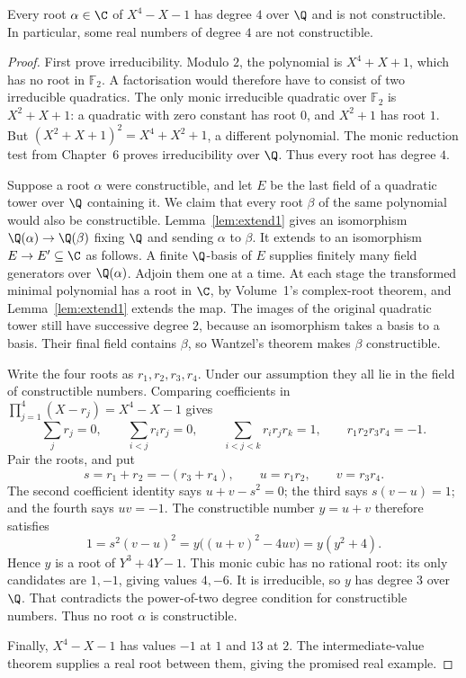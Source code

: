 \begin{proposition}\label{prop:quartic-nonconstructible}
Every root $\alpha\in\C$ of $X^4-X-1$ has degree $4$ over $\Q$ and
is not constructible. In particular, some real numbers of degree $4$
are not constructible.
\end{proposition}
\begin{proof}
First prove irreducibility. Modulo $2$, the polynomial is $X^4+X+1$,
which has no root in $\mathbb F_2$. A factorisation would therefore
have to consist of two irreducible quadratics. The only monic
irreducible quadratic over $\mathbb F_2$ is $X^2+X+1$: a quadratic
with zero constant has root $0$, and $X^2+1$ has root $1$.
But $(X^2+X+1)^2=X^4+X^2+1$, a different polynomial.
The monic reduction test from Chapter~6 proves irreducibility over
$\Q$. Thus every root has degree $4$.

Suppose a root $\alpha$ were constructible, and let $E$ be the last
field of a quadratic tower over $\Q$ containing it. We claim that
every root $\beta$ of the same polynomial would also be constructible.
Lemma~\ref{lem:extend1} gives an isomorphism
$\Q(\alpha)\to\Q(\beta)$ fixing $\Q$ and sending $\alpha$ to $\beta$.
It extends to an isomorphism $E\to E'\subseteq\C$ as follows.
A finite $\Q$-basis of $E$ supplies finitely many field generators
over $\Q(\alpha)$. Adjoin them one at a time. At each stage the
transformed minimal polynomial has a root in $\C$, by Volume~1's
complex-root theorem, and Lemma~\ref{lem:extend1} extends the map.
The images of the original quadratic tower still have successive
degree $2$, because an isomorphism takes a basis to a basis.
Their final field contains $\beta$, so Wantzel's theorem makes
$\beta$ constructible.

Write the four roots as $r_1,r_2,r_3,r_4$. Under our assumption they
all lie in the field of constructible numbers. Comparing coefficients
in $\prod_{j=1}^4(X-r_j)=X^4-X-1$ gives
\[
\sum_jr_j=0,\qquad \sum_{i<j}r_ir_j=0,\qquad
\sum_{i<j<k}r_ir_jr_k=1,\qquad r_1r_2r_3r_4=-1.
\]
Pair the roots, and put
\[
s=r_1+r_2=-(r_3+r_4),\qquad u=r_1r_2,\qquad v=r_3r_4.
\]
The second coefficient identity says $u+v-s^2=0$; the third says
$s(v-u)=1$; and the fourth says $uv=-1$. The constructible number
$y=u+v$ therefore satisfies
\[
1=s^2(v-u)^2=y\bigl((u+v)^2-4uv\bigr)=y(y^2+4).
\]
Hence $y$ is a root of $Y^3+4Y-1$. This monic cubic has no rational
root: its only candidates are $1,-1$, giving values $4,-6$.
It is irreducible, so $y$ has degree $3$ over $\Q$. That contradicts
the power-of-two degree condition for constructible numbers.
Thus no root $\alpha$ is constructible.

Finally, $X^4-X-1$ has values $-1$ at $1$ and $13$ at $2$.
The intermediate-value theorem supplies a real root between them,
giving the promised real example.
\end{proof}

